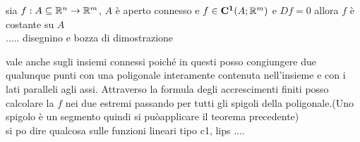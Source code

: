 \proposition
sia $f:A\subseteq \mathbb{R}^n \rightarrow \mathbb{R}^m$, $A$ è aperto connesso e $f\in \mathbf{C^{1}}(A;\mathbb{R}^m)$ e $Df=0$ allora $f$ è costante su $A$\\
..... disegnino e bozza di dimostrazione

\observation vale anche sugli insiemi connessi poiché in questi posso congiungere due qualunque punti con una poligonale interamente contenuta nell'insieme e con i lati paralleli agli assi. Attraverso la formula degli accrescimenti finiti posso calcolare la $f$ nei due estremi passando per tutti gli spigoli della poligonale.(Uno spigolo è un segmento quindi si puòapplicare il teorema precedente)\\

si po dire qualcosa sulle funzioni lineari tipo c1, lips ....\\

